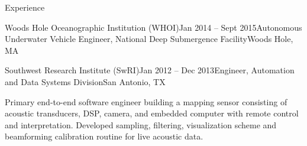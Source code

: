 \documentclass{resume} %
\begin{document}
\begin{rSection}{Experience}
\begin{rSubsection}{Woods Hole Oceanographic Institution (WHOI)}{Jan 2014 -- Sept 2015}{Autonomous Underwater Vehicle Engineer, National Deep Submergence Facility}{Woods Hole, MA}
\end{rSubsection}
	\vspace{-.2cm}
\begin{rSubsection}{Southwest Research Institute (SwRI)}{Jan 2012 -- Dec 2013}{Engineer, Automation and Data Systems Division}{San Antonio, TX}{}
\item{Primary end-to-end software engineer building a mapping sensor consisting of acoustic transducers, DSP, camera, and embedded computer with remote control and interpretation. Developed sampling, filtering, visualization scheme and beamforming calibration routine for live acoustic data.}
\end{rSubsection}
\end{rSection}
	\vspace{-.5cm}
% 
\end{document}
